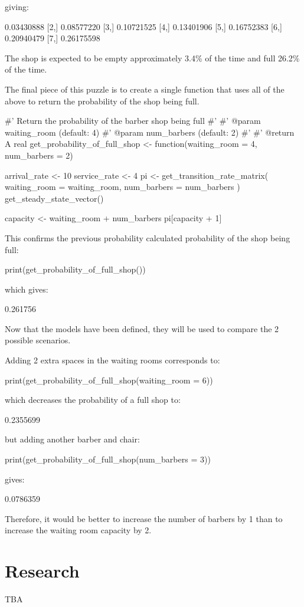 giving:

\begin{Rout}
           [,1]
[1,] 0.03430888
[2,] 0.08577220
[3,] 0.10721525
[4,] 0.13401906
[5,] 0.16752383
[6,] 0.20940479
[7,] 0.26175598
\end{Rout}

The shop is expected to be empty approximately 3.4\% of the time
and full 26.2\% of the time.

The final piece of this puzzle is to create a single function that uses all of
the above to return the probability of the shop being full.

\begin{Rin}
#' Return the probability of the barber shop being full
#'
#' @param waiting_room (default: 4)
#' @param num_barbers (default: 2)
#'
#' @return A real
get_probability_of_full_shop <- function(waiting_room = 4,
                                         num_barbers = 2){
  arrival_rate <- 10
  service_rate <- 4
  pi <- get_transition_rate_matrix(
    waiting_room = waiting_room,
    num_barbers = num_barbers
    ) %
    get_steady_state_vector()

  capacity <- waiting_room + num_barbers
  pi[capacity + 1]
}
\end{Rin}

This confirms the previous probability calculated probability of the shop
being full:

\begin{Rin}
print(get_probability_of_full_shop())
\end{Rin}

which gives:

\begin{Rout}
[1] 0.261756
\end{Rout}

Now that the models have been defined, they will be used to compare the 2
possible scenarios.

Adding 2 extra spaces in the waiting rooms corresponds to:

\begin{Rin}
print(get_probability_of_full_shop(waiting_room = 6))
\end{Rin}

which decreases the probability of a full shop to:

\begin{Rout}
[1] 0.2355699
\end{Rout}

but adding another barber and chair:

\begin{Rin}
print(get_probability_of_full_shop(num_barbers = 3))
\end{Rin}

gives:

\begin{Rout}
[1] 0.0786359
\end{Rout}

Therefore, it would be better to increase the number of barbers by 1
than to increase the waiting room capacity by 2.


\section{Research}\label{sec:research}

TBA
